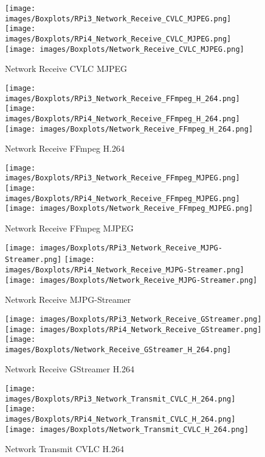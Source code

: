 \begin{figure}[H]
\centering
\texttt{[image: images/Boxplots/RPi3\_Network\_Receive\_CVLC\_MJPEG.png]}\hfill
\texttt{[image: images/Boxplots/RPi4\_Network\_Receive\_CVLC\_MJPEG.png]}\hfill
\texttt{[image: images/Boxplots/Network\_Receive\_CVLC\_MJPEG.png]}
\caption{Network Receive CVLC MJPEG}
\label{fig:bp14}
\end{figure}

\begin{figure}[H]
\centering
\texttt{[image: images/Boxplots/RPi3\_Network\_Receive\_FFmpeg\_H\_264.png]}\hfill
\texttt{[image: images/Boxplots/RPi4\_Network\_Receive\_FFmpeg\_H\_264.png]}\hfill
\texttt{[image: images/Boxplots/Network\_Receive\_FFmpeg\_H\_264.png]}
\caption{Network Receive FFmpeg H.264}
\label{fig:bp14}
\end{figure}

\begin{figure}[H]
\centering
\texttt{[image: images/Boxplots/RPi3\_Network\_Receive\_FFmpeg\_MJPEG.png]}\hfill
\texttt{[image: images/Boxplots/RPi4\_Network\_Receive\_FFmpeg\_MJPEG.png]}\hfill
\texttt{[image: images/Boxplots/Network\_Receive\_FFmpeg\_MJPEG.png]}
\caption{Network Receive FFmpeg MJPEG}
\label{fig:bp15}
\end{figure}

\begin{figure}[H]
\centering
\texttt{[image: images/Boxplots/RPi3\_Network\_Receive\_MJPG-Streamer.png]}\hfill
\texttt{[image: images/Boxplots/RPi4\_Network\_Receive\_MJPG-Streamer.png]}\hfill
\texttt{[image: images/Boxplots/Network\_Receive\_MJPG-Streamer.png]}
\caption{Network Receive MJPG-Streamer}
\label{fig:bp16}
\end{figure}

\begin{figure}[H]
\centering
\texttt{[image: images/Boxplots/RPi3\_Network\_Receive\_GStreamer.png]}\hfill
\texttt{[image: images/Boxplots/RPi4\_Network\_Receive\_GStreamer.png]}\hfill
\texttt{[image: images/Boxplots/Network\_Receive\_GStreamer\_H\_264.png]}
\caption{Network Receive GStreamer H.264}
\label{fig:bp17}
\end{figure}

\begin{figure}[H]
\centering
\texttt{[image: images/Boxplots/RPi3\_Network\_Transmit\_CVLC\_H\_264.png]}\hfill
\texttt{[image: images/Boxplots/RPi4\_Network\_Transmit\_CVLC\_H\_264.png]}\hfill
\texttt{[image: images/Boxplots/Network\_Transmit\_CVLC\_H\_264.png]}
\caption{Network Transmit CVLC H.264}
\label{fig:bp18}
\end{figure}

